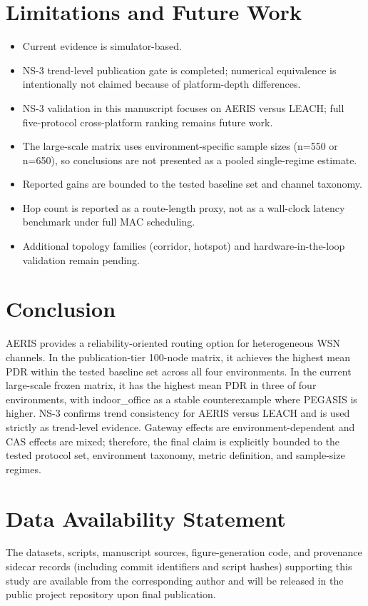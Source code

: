 \documentclass[sensors,article,submit,moreauthors,pdftex]{Definitions/mdpi}
\begin{document}
\section{Limitations and Future Work}
\begin{itemize}
\item Current evidence is simulator-based.
\item NS-3 trend-level publication gate is completed; numerical equivalence is intentionally not claimed because of platform-depth differences.
\item NS-3 validation in this manuscript focuses on AERIS versus LEACH; full five-protocol cross-platform ranking remains future work.
\item The large-scale matrix uses environment-specific sample sizes (n=550 or n=650), so conclusions are not presented as a pooled single-regime estimate.
\item Reported gains are bounded to the tested baseline set and channel taxonomy.
\item Hop count is reported as a route-length proxy, not as a wall-clock latency benchmark under full MAC scheduling.
\item Additional topology families (corridor, hotspot) and hardware-in-the-loop validation remain pending.
\end{itemize}

\section{Conclusion}
AERIS provides a reliability-oriented routing option for heterogeneous WSN channels. In the publication-tier 100-node matrix, it achieves the highest mean PDR within the tested baseline set across all four environments. In the current large-scale frozen matrix, it has the highest mean PDR in three of four environments, with indoor\_office as a stable counterexample where PEGASIS is higher. NS-3 confirms trend consistency for AERIS versus LEACH and is used strictly as trend-level evidence. Gateway effects are environment-dependent and CAS effects are mixed; therefore, the final claim is explicitly bounded to the tested protocol set, environment taxonomy, metric definition, and sample-size regimes.

\section*{Data Availability Statement}
The datasets, scripts, manuscript sources, figure-generation code, and provenance sidecar records (including commit identifiers and script hashes) supporting this study are available from the corresponding author and will be released in the public project repository upon final publication.


\end{document}

